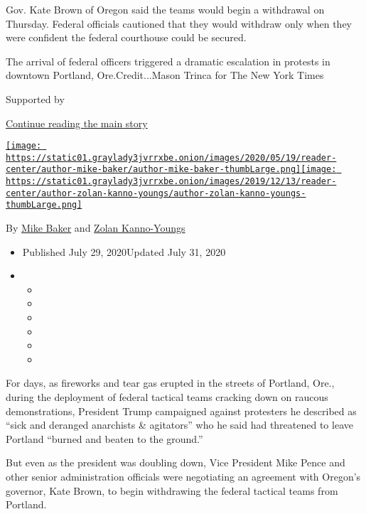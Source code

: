 Gov. Kate Brown of Oregon said the teams would begin a withdrawal on
Thursday. Federal officials cautioned that they would withdraw only when
they were confident the federal courthouse could be secured.

The arrival of federal officers triggered a dramatic escalation in
protests in downtown Portland, Ore.Credit...Mason Trinca for The New
York Times

Supported by

\protect\hyperlink{after-sponsor}{Continue reading the main story}

\href{https://www.nytimes3xbfgragh.onion/by/mike-baker}{\texttt{[image: https://static01.graylady3jvrrxbe.onion/images/2020/05/19/reader-center/author-mike-baker/author-mike-baker-thumbLarge.png]}}\href{https://www.nytimes3xbfgragh.onion/by/zolan-kanno-youngs}{\texttt{[image: https://static01.graylady3jvrrxbe.onion/images/2019/12/13/reader-center/author-zolan-kanno-youngs/author-zolan-kanno-youngs-thumbLarge.png]}}

By \href{https://www.nytimes3xbfgragh.onion/by/mike-baker}{Mike Baker}
and
\href{https://www.nytimes3xbfgragh.onion/by/zolan-kanno-youngs}{Zolan
Kanno-Youngs}

\begin{itemize}
\item
  Published July 29, 2020Updated July 31, 2020
\item
  \begin{itemize}
  \item
  \item
  \item
  \item
  \item
  \item
  \end{itemize}
\end{itemize}

For days, as fireworks and tear gas erupted in the streets of Portland,
Ore., during the deployment of federal tactical teams cracking down on
raucous demonstrations, President Trump campaigned against protesters he
described as ``sick and deranged anarchists \& agitators'' who he said
had threatened to leave Portland ``burned and beaten to the ground.''

But even as the president was doubling down, Vice President Mike Pence
and other senior administration officials were negotiating an agreement
with Oregon's governor, Kate Brown, to begin withdrawing the federal
tactical teams from Portland.

